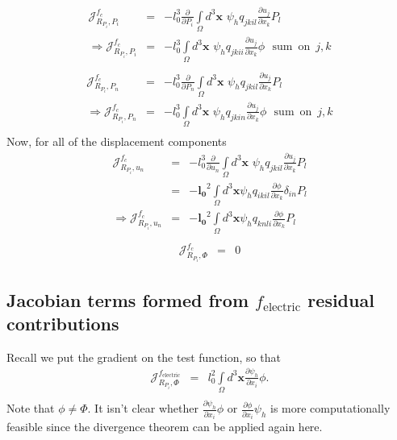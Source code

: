 \documentclass[16pt]{article} %
\begin{document}
\begin{eqnarray}\nonumber
\mathscr{J}_{R_{P_i}, P_i}^{f_c} &=& - l_0^3 \frac{\partial}{\partial P_i} \int\limits_\Omega  d^3 {\boldsymbol x} \,\, \psi_h q_{jkil} \frac{\partial u_j}{\partial x_k} P_l \\ \nonumber
\Rightarrow \mathscr{J}_{R_{P_i}, P_i}^{f_c} &=&- l_0^3 \int\limits_\Omega  d^3 {\boldsymbol x} \,\, \psi_h q_{jkii} \frac{\partial u_j}{\partial x_k} \phi \,\,\,\,\mathrm{sum}\,\,\,\mathrm{on}\,\,\, j,k\\ \nonumber
\end{eqnarray}
\begin{eqnarray}\nonumber
\mathscr{J}_{R_{P_i}, P_n}^{f_c} &=& - l_0^3 \frac{\partial}{\partial P_n} \int\limits_\Omega  d^3 {\boldsymbol x} \,\, \psi_h q_{jkil} \frac{\partial u_j}{\partial x_k} P_l \\ \nonumber
\Rightarrow \mathscr{J}_{R_{P_i}, P_n}^{f_c} &=&- l_0^3  \int\limits_\Omega  d^3 {\boldsymbol x} \,\, \psi_h q_{jkin} \frac{\partial u_j}{\partial x_k} \phi \,\,\,\,\mathrm{sum}\,\,\,\mathrm{on}\,\,\, j,k\\ \nonumber
\end{eqnarray}
Now, for all of the displacement components
\begin{eqnarray}\nonumber
\mathscr{J}_{R_{P_i}, u_n}^{f_c} &=&- l_0^3 \frac{\partial}{\partial u_n}\int\limits_\Omega  d^3 {\boldsymbol x} \,\, \psi_h q_{jkil} \frac{\partial u_j}{\partial x_k} P_l \\ \nonumber
&=& - \mathbf{l_0}^2 \int\limits_\Omega d^3 {\boldsymbol x} \psi_h q_{ikil} \frac{\partial \phi}{\partial x_k} \delta_{in} P_l \\ \nonumber
\Rightarrow \mathscr{J}_{R_{P_i}, u_n}^{f_c} &=& - \mathbf{l_0}^2 \int\limits_\Omega d^3 {\boldsymbol x} \psi_h q_{knli} \frac{\partial \phi}{\partial x_k} P_l \\ \nonumber %
\end{eqnarray}
\begin{eqnarray}\nonumber
\mathscr{J}_{R_{P_i}, \Phi}^{f_c} &=& 0
\end{eqnarray}

\subsection{Jacobian terms formed from $f_\mathrm{electric}$ residual contributions}

Recall we put the gradient on the test function, so that
\begin{eqnarray}\nonumber
\mathscr{J}_{R_{P_i}, \Phi}^{f_\mathrm{electric}} &=& l_0^2 \int\limits_\Omega d^3 {\boldsymbol x}\frac{\partial \psi_h}{\partial x_i} \phi. \\ \nonumber
\end{eqnarray}
Note that $\phi \neq \Phi$. It isn't clear whether $\frac{\partial \psi_h}{\partial x_i} \phi$ or $\frac{\partial \phi}{\partial x_i} \psi_h$ is more computationally feasible since the divergence theorem can be applied again here.
\end{document}
